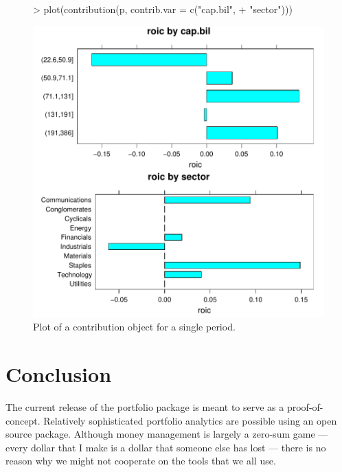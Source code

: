 \documentclass[a4paper]{report}
\begin{document}
\begin{article}
\begin{figure}
\centering
\vspace*{.1in}
\begin{Schunk}
\begin{Sinput}
> plot(contribution(p, contrib.var = c("cap.bil", 
+     "sector")))
\end{Sinput}
\end{Schunk}
\includegraphics{portfolio-015}
\caption{\label{figure:plot.contribution} Plot of a contribution object for a
single period.}
\end{figure}

\section*{Conclusion}

The current release of the portfolio package is meant to serve as a
proof-of-concept. Relatively sophisticated portfolio analytics are
possible using an open source package. Although money management is
largely a zero-sum game --- every dollar that I make is a dollar that
someone else has lost --- there is no reason why we might not
cooperate on the tools that we all use.

\address{David Kane and Jeff Enos\\
 Kane Capital Management, Cambridge, Massachusetts, USA\\
  and  }
\end{article}
\end{document}
